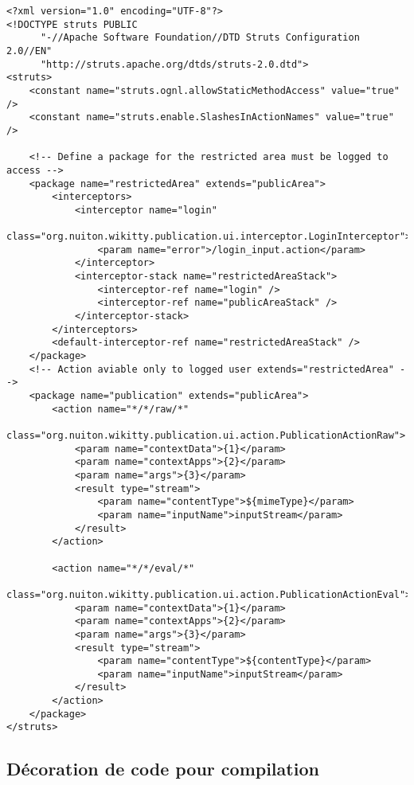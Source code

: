 \begin{lstlisting}
<?xml version="1.0" encoding="UTF-8"?>
<!DOCTYPE struts PUBLIC 
	  "-//Apache Software Foundation//DTD Struts Configuration 2.0//EN"
	  "http://struts.apache.org/dtds/struts-2.0.dtd">
<struts>
    <constant name="struts.ognl.allowStaticMethodAccess" value="true" />
    <constant name="struts.enable.SlashesInActionNames" value="true" />

    <!-- Define a package for the restricted area must be logged to access -->
    <package name="restrictedArea" extends="publicArea">
        <interceptors>
            <interceptor name="login"
                class="org.nuiton.wikitty.publication.ui.interceptor.LoginInterceptor">
                <param name="error">/login_input.action</param>
            </interceptor>
            <interceptor-stack name="restrictedAreaStack">
                <interceptor-ref name="login" />
                <interceptor-ref name="publicAreaStack" />
            </interceptor-stack>
        </interceptors>
        <default-interceptor-ref name="restrictedAreaStack" />
    </package>
    <!-- Action aviable only to logged user extends="restrictedArea" -->
    <package name="publication" extends="publicArea">
        <action name="*/*/raw/*"
            class="org.nuiton.wikitty.publication.ui.action.PublicationActionRaw">
            <param name="contextData">{1}</param>
            <param name="contextApps">{2}</param>
            <param name="args">{3}</param>
            <result type="stream">
                <param name="contentType">${mimeType}</param>
                <param name="inputName">inputStream</param>
            </result>
        </action>

        <action name="*/*/eval/*"
            class="org.nuiton.wikitty.publication.ui.action.PublicationActionEval">
            <param name="contextData">{1}</param>
            <param name="contextApps">{2}</param>
            <param name="args">{3}</param>
            <result type="stream">
                <param name="contentType">${contentType}</param>
                <param name="inputName">inputStream</param>
            </result>
        </action>
    </package>
</struts>
\end{lstlisting}



\subsection*{Décoration de code pour compilation}


